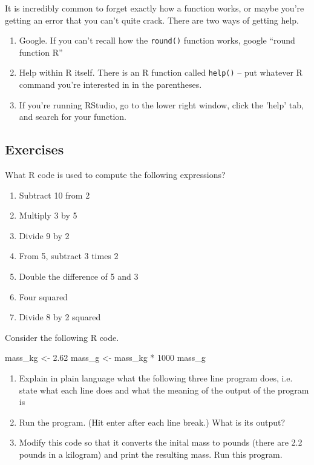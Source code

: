 It is incredibly common to forget exactly how a function works, or
maybe you're getting an error that you can't quite crack. There are
two ways of getting help.

\begin{enumerate}
\item Google.  If you can't recall how the \texttt{round()} function
  works, google ``round function R''
\item Help within R itself.  There is an R function called \texttt{help()} -- put whatever R command you're interested in in the parentheses.
\item If you're running RStudio, go to the lower right window, click the
  'help' tab, and search for your function.
\end{enumerate}

\subsection{Exercises}

\begin{q}
  What R code is used to compute the following expressions?
  \begin{enumerate}
  \item Subtract 10 from 2 
  \item Multiply 3 by 5
  \item Divide 9 by 2
  \item From 5, subtract 3 times 2
  \item Double the difference of 5 and 3
  \item Four squared
  \item Divide 8 by 2 squared
  \end{enumerate}
\end{q} 


\begin{q}
  Consider the following R code.

\begin{rcode}
mass_kg <- 2.62 
mass_g <- mass_kg * 1000 
mass_g 
\end{rcode}

\begin{enumerate}
\item Explain in plain language what the following three line program
  does, i.e. state what each line does and what the meaning of the
  output of the program is
\item  Run the program. (Hit enter after each line break.) What is its output?  
\item  Modify this code so that it converts the inital mass to pounds (there are 2.2
  pounds in a kilogram) and print the resulting mass.  Run this
  program.
\end{enumerate} 
\end{q} 

